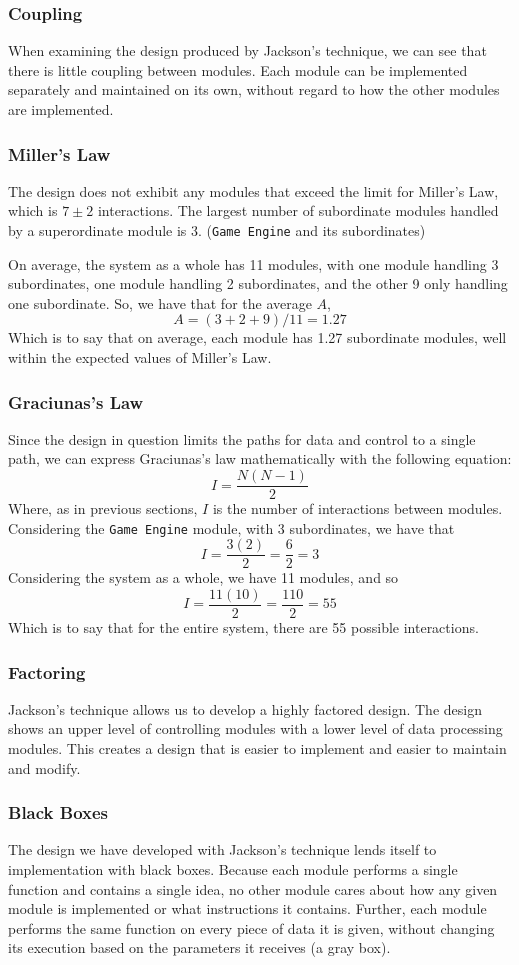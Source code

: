 \documentclass{article}
\begin{document}
		\subsubsection{Coupling}
			When examining the design produced by Jackson's technique, we can see that there is little coupling between modules. Each module can be implemented separately and maintained on its own, without regard to how the other modules are implemented. 
		\subsubsection{Miller's Law}
			The design does not exhibit any modules that exceed the limit for Miller's Law, which is $7\pm2$ interactions. The largest number of subordinate modules handled by a superordinate module is 3. (\texttt{Game Engine} and its subordinates)
			
			On average, the system as a whole has 11 modules, with one module handling 3 subordinates, one module handling 2 subordinates, and the other 9 only handling one subordinate. So, we have that for the average $A$,
			$$A = (3 + 2 + 9)/11 = 1.27$$
			Which is to say that on average, each module has 1.27 subordinate modules, well within the expected values of Miller's Law.
		\subsubsection{Graciunas's Law}
			 Since the design in question limits the paths for data and control to a single path, we can express Graciunas's law mathematically with the following equation:
			 $$I = \frac{N(N-1)}{2}$$
			 Where, as in previous sections, $I$ is the number of interactions between modules. Considering the \texttt{Game Engine} module, with 3 subordinates, we have that 
			 $$I = \frac{3(2)}{2} = \frac{6}{2} = 3$$
			 Considering the system as a whole, we have 11 modules, and so 
			 $$I = \frac{11(10)}{2} = \frac{110}{2} = 55$$
			 Which is to say that for the entire system, there are 55 possible interactions. 
		\subsubsection{Factoring} 
			Jackson's technique allows us to develop a highly factored design. The design shows an upper level of controlling modules with a lower level of data processing modules. This creates a design that is easier to implement and easier to maintain and modify. 
		\subsubsection{Black Boxes}
			The design we have developed with Jackson's technique lends itself to implementation with black boxes. Because each module performs a single function and contains a single idea, no other module cares about how any given module is implemented or what instructions it contains. Further, each module performs the same function on every piece of data it is given, without changing its execution based on the parameters it receives (a gray box). 
\end{document}
